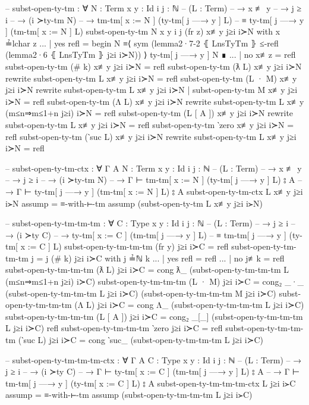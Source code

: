 \documentclass[logo,bsc,singlespacing,parskip,online]{infthesis}
\renewenvironment{code}{\mintedcopy[breaklines,breaksymbolleft=\;]{agda}}{\endmintedcopy}
\begin{document}
\begin{code}
  -- subst-open-ty-tm : ∀ {N : Term} {x y : Id} {i j : ℕ}
  --   (L : Term)
  --   → x ≢ y
  --   → j ≥ i
  --   → (i ≻ty-tm N)
  --   → tm-tm[ x := N ] (ty-tm[ j —→ y ] L)
  --     ≡ ty-tm[ j —→ y ] (tm-tm[ x := N ] L)
  subst-open-ty-tm {N} {x} {y} {i} {j} (fr z) x≢y j≥i i≻N with x ≟lchar z
  ... | yes refl =
    begin
      N
    ≡⟨ sym (lemma2·7-2 ⦃ LnsTyTm ⦄ ≤-refl (lemma2·6 ⦃ LnsTyTm ⦄ j≥i i≻N)) ⟩
      ty-tm[ j —→ y ] N
    ∎
  ... | no  x≢z  = refl
  subst-open-ty-tm (# k) x≢y j≥i i≻N = refl
  subst-open-ty-tm (ƛ L) x≢y j≥i i≻N
    rewrite subst-open-ty-tm L x≢y j≥i i≻N = refl
  subst-open-ty-tm (L · M) x≢y j≥i i≻N
    rewrite subst-open-ty-tm L x≢y j≥i i≻N
    | subst-open-ty-tm M x≢y j≥i i≻N
    = refl
  subst-open-ty-tm (Λ L) x≢y j≥i i≻N
    rewrite subst-open-ty-tm L x≢y (m≤n⇒m≤1+n j≥i) i≻N = refl
  subst-open-ty-tm (L [ A ]) x≢y j≥i i≻N
    rewrite subst-open-ty-tm L x≢y j≥i i≻N = refl
  subst-open-ty-tm ‵zero x≢y j≥i i≻N = refl
  subst-open-ty-tm (‵suc L) x≢y j≥i i≻N rewrite
    subst-open-ty-tm L x≢y j≥i i≻N = refl

  -- subst-open-ty-tm-ctx : ∀ {Γ A} {N : Term} {x y : Id} {i j : ℕ}
  --   (L : Term)
  --   → x ≢ y
  --   → j ≥ i
  --   → (i ≻ty-tm N)
  --   → Γ ⊢ tm-tm[ x := N ] (ty-tm[ j —→ y ] L) ⦂ A
  --   → Γ ⊢ ty-tm[ j —→ y ] (tm-tm[ x := N ] L) ⦂ A
  subst-open-ty-tm-ctx L x≢y j≥i i≻N assump = ≡-with-⊢-tm assump (subst-open-ty-tm L x≢y j≥i i≻N)

  -- subst-open-ty-tm-tm-tm : ∀ {C : Type} {x y : Id} {i j : ℕ}
  --   (L : Term)
  --   → j ≥ i
  --   → (i ≻ty C)
  --   → ty-tm[ x := C ] (tm-tm[ j —→ y ] L)
  --     ≡ tm-tm[ j —→ y ] (ty-tm[ x := C ] L)
  subst-open-ty-tm-tm-tm (fr y) j≥i i≻C = refl
  subst-open-ty-tm-tm-tm {j = j} (# k) j≥i i≻C with j ≟ℕ k
  ... | yes refl = refl
  ... | no  j≢k  = refl
  subst-open-ty-tm-tm-tm (ƛ L) j≥i i≻C = cong ƛ_
    (subst-open-ty-tm-tm-tm L (m≤n⇒m≤1+n j≥i) i≻C)
  subst-open-ty-tm-tm-tm (L · M) j≥i i≻C = cong₂ _·_
    (subst-open-ty-tm-tm-tm L j≥i i≻C)
    (subst-open-ty-tm-tm-tm M j≥i i≻C)
  subst-open-ty-tm-tm-tm (Λ L) j≥i i≻C = cong Λ_
    (subst-open-ty-tm-tm-tm L j≥i i≻C)
  subst-open-ty-tm-tm-tm (L [ A ]) j≥i i≻C = cong₂ _[_]
    (subst-open-ty-tm-tm-tm L j≥i i≻C)
    refl
  subst-open-ty-tm-tm-tm ‵zero j≥i i≻C = refl
  subst-open-ty-tm-tm-tm (‵suc L) j≥i i≻C = cong ‵suc_
    (subst-open-ty-tm-tm-tm L j≥i i≻C)

  -- subst-open-ty-tm-tm-tm-ctx : ∀ {Γ A} {C : Type} {x y : Id} {i j : ℕ}
  --   (L : Term)
  --   → j ≥ i
  --   → (i ≻ty C)
  --   → Γ ⊢ ty-tm[ x := C ] (tm-tm[ j —→ y ] L) ⦂ A
  --   → Γ ⊢ tm-tm[ j —→ y ] (ty-tm[ x := C ] L) ⦂ A
  subst-open-ty-tm-tm-tm-ctx L j≥i i≻C assump = ≡-with-⊢-tm assump (subst-open-ty-tm-tm-tm L j≥i i≻C)


\end{code}
\end{document}
